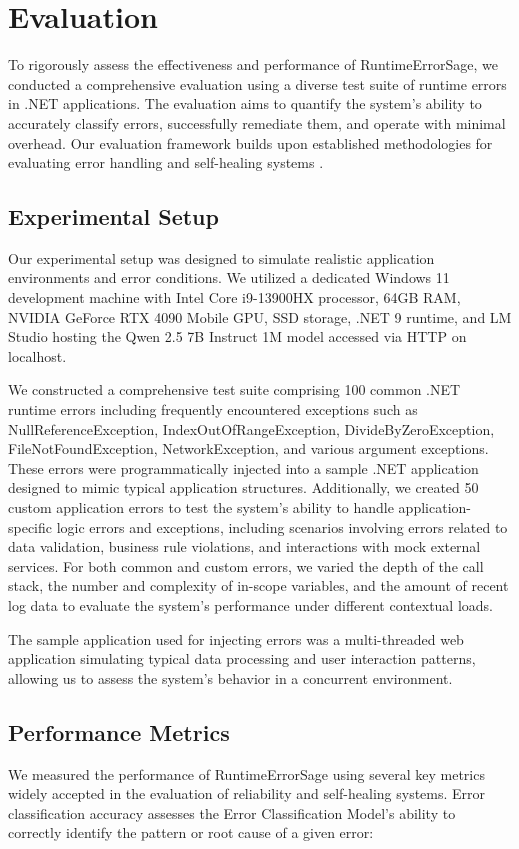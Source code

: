 \section{Evaluation}\label{sec:evaluation}
To rigorously assess the effectiveness and performance of RuntimeErrorSage, we conducted a comprehensive evaluation using a diverse test suite of runtime errors in .NET applications. The evaluation aims to quantify the system's ability to accurately classify errors, successfully remediate them, and operate with minimal overhead. Our evaluation framework builds upon established methodologies for evaluating error handling and self-healing systems \cite{software_dependability_evaluation_2014, self_healing_systems_metrics_2018}.

\subsection{Experimental Setup}
Our experimental setup was designed to simulate realistic application environments and error conditions. We utilized a dedicated Windows 11 development machine with Intel Core i9-13900HX processor, 64GB RAM, NVIDIA GeForce RTX 4090 Mobile GPU, SSD storage, .NET 9 runtime, and LM Studio hosting the Qwen 2.5 7B Instruct 1M model accessed via HTTP on localhost.

We constructed a comprehensive test suite comprising 100 common .NET runtime errors including frequently encountered exceptions such as NullReferenceException, IndexOutOfRangeException, DivideByZeroException, FileNotFoundException, NetworkException, and various argument exceptions. These errors were programmatically injected into a sample .NET application designed to mimic typical application structures. Additionally, we created 50 custom application errors to test the system's ability to handle application-specific logic errors and exceptions, including scenarios involving errors related to data validation, business rule violations, and interactions with mock external services. For both common and custom errors, we varied the depth of the call stack, the number and complexity of in-scope variables, and the amount of recent log data to evaluate the system's performance under different contextual loads.

The sample application used for injecting errors was a multi-threaded web application simulating typical data processing and user interaction patterns, allowing us to assess the system's behavior in a concurrent environment.

\subsection{Performance Metrics}
We measured the performance of RuntimeErrorSage using several key metrics widely accepted in the evaluation of reliability and self-healing systems. Error classification accuracy assesses the Error Classification Model's ability to correctly identify the pattern or root cause of a given error:

